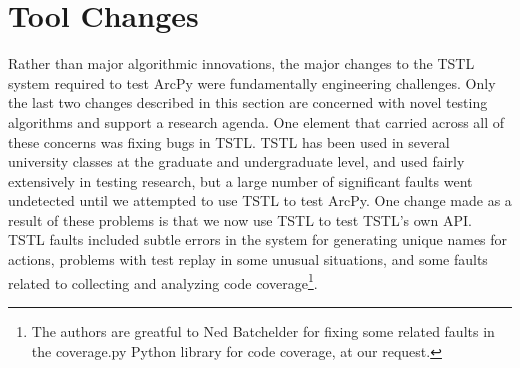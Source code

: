 \section{Tool Changes}

Rather than major algorithmic innovations, the major changes to the
TSTL system required to test ArcPy were fundamentally engineering
challenges.  Only the last two changes described in this section are
concerned with novel testing algorithms and support a research
agenda.  One element that carried across all of these concerns was
fixing bugs in TSTL.  TSTL has been used in several university classes
at the graduate and undergraduate level, and used fairly extensively
in testing research, but a large number of
significant faults went undetected until we attempted to use TSTL to
test ArcPy.  One change made as a result of these problems is that we
now use TSTL to test TSTL's own API.  TSTL faults included subtle
errors in the system for generating unique names for actions, problems
with test replay in some unusual situations, and some faults related
to collecting and analyzing code coverage\footnote{The authors are
  greatful to Ned Batchelder for fixing some related faults in the
  coverage.py \cite{Coveragepy}  Python library for code coverage, at our request.}.











